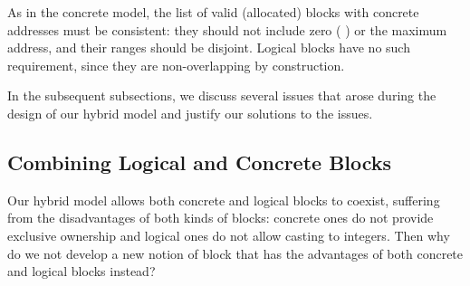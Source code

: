 As in the concrete model, the list of valid (\ie allocated) blocks with concrete addresses must be
consistent: they should not include zero (\ie{} ) or the maximum address, and their
ranges should be disjoint. Logical blocks have no such requirement, since they are non-overlapping
by construction.

In the subsequent subsections, we discuss several issues that arose during the design of our hybrid
model and justify our solutions to the issues.

\subsection{Combining Logical and Concrete Blocks}
\label{sec:intptrcast:formal-semantics:hybrid}


Our hybrid model allows both concrete and logical blocks to coexist, suffering from the
disadvantages of both kinds of blocks: concrete ones do not provide exclusive ownership and logical
ones do not allow casting to integers.  Then why do we not develop a new notion of block that has
the advantages of both concrete and logical blocks instead?

